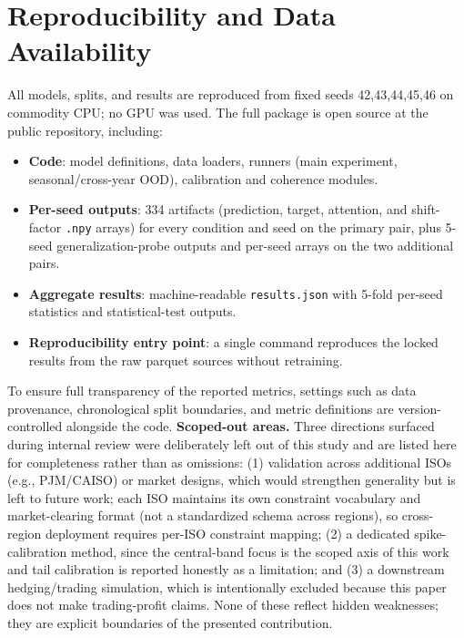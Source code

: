 \documentclass[twoside]{article}
\begin{document}
\section{Reproducibility and Data Availability}
All models, splits, and results are reproduced from fixed seeds {42,43,44,45,46} on commodity CPU; no GPU was used. The full package is open source at the public repository, including:
\begin{itemize}
  \item \textbf{Code}: model definitions, data loaders, runners (main experiment, seasonal/cross-year OOD), calibration and coherence modules.
  \item \textbf{Per-seed outputs}: 334 artifacts (prediction, target, attention, and shift-factor \texttt{.npy} arrays) for every condition and seed on the primary pair, plus 5-seed generalization-probe outputs and per-seed arrays on the two additional pairs.
  \item \textbf{Aggregate results}: machine-readable \texttt{results.json} with 5-fold per-seed statistics and statistical-test outputs.
  \item \textbf{Reproducibility entry point}: a single command reproduces the locked results from the raw parquet sources without retraining.
\end{itemize}
To ensure full transparency of the reported metrics, settings such as data provenance, chronological split boundaries, and metric definitions are version-controlled alongside the code.
\textbf{Scoped-out areas.} Three directions surfaced during internal review were deliberately left out of this study and are listed here for completeness rather than as omissions: (1) validation across additional ISOs (e.g., PJM/CAISO) or market designs, which would strengthen generality but is left to future work; each ISO maintains its own constraint vocabulary and market-clearing format (not a standardized schema across regions), so cross-region deployment requires per-ISO constraint mapping; (2) a dedicated spike-calibration method, since the central-band focus is the scoped axis of this work and tail calibration is reported honestly as a limitation; and (3) a downstream hedging/trading simulation, which is intentionally excluded because this paper does not make trading-profit claims. None of these reflect hidden weaknesses; they are explicit boundaries of the presented contribution.
\end{document}
